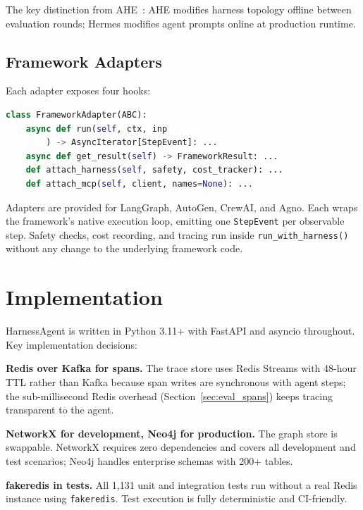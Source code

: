 \documentclass[conference]{IEEEtran}
\begin{document}
The key distinction from AHE~\cite{lin2026ahe}: AHE modifies harness
topology offline between evaluation rounds; Hermes modifies agent
prompts online at production runtime.

\subsection{Framework Adapters}
\label{sec:adapters}

Each adapter exposes four hooks:

\begin{lstlisting}[language=Python, caption={Adapter interface}]
class FrameworkAdapter(ABC):
    async def run(self, ctx, inp
        ) -> AsyncIterator[StepEvent]: ...
    async def get_result(self) -> FrameworkResult: ...
    def attach_harness(self, safety, cost_tracker): ...
    def attach_mcp(self, client, names=None): ...
\end{lstlisting}

Adapters are provided for LangGraph, AutoGen, CrewAI, and Agno. Each
wraps the framework's native execution loop, emitting one
\texttt{StepEvent} per observable step. Safety checks, cost recording,
and tracing run inside \texttt{run\_with\_harness()} without any change
to the underlying framework code.

\section{Implementation}
\label{sec:implementation}

HarnessAgent is written in Python 3.11+ with FastAPI and asyncio
throughout. Key implementation decisions:

\textbf{Redis over Kafka for spans.} The trace store uses Redis Streams
with 48-hour TTL rather than Kafka because span writes are synchronous
with agent steps; the sub-millisecond Redis overhead (Section~\ref{sec:eval_spans})
keeps tracing transparent to the agent.

\textbf{NetworkX for development, Neo4j for production.} The graph store
is swappable. NetworkX requires zero dependencies and covers all
development and test scenarios; Neo4j handles enterprise schemas with
200+ tables.

\textbf{fakeredis in tests.} All 1,131 unit and integration tests run
without a real Redis instance using \texttt{fakeredis}. Test execution
is fully deterministic and CI-friendly.
\end{document}
